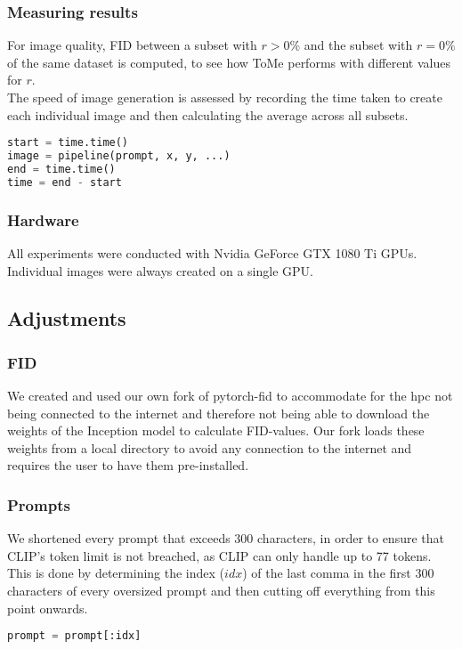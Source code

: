 \subsubsection*{Measuring results}
For image quality, FID between a subset with \(r > 0\%\) and the subset with \(r = 0\%\) of the same dataset is computed, to see how ToMe performs with different values for \(r\).\\
The speed of image generation is assessed by recording the time taken to create each individual image and then calculating the average across all subsets.
\begin{lstlisting}[language=Python]
start = time.time()
image = pipeline(prompt, x, y, ...)
end = time.time()
time = end - start
\end{lstlisting}



\subsubsection*{Hardware}
All experiments were conducted with Nvidia GeForce GTX 1080 Ti GPUs. Individual images were always created on a single GPU.



\subsection{Adjustments}
\subsubsection*{FID}
We created and used our own fork of pytorch-fid \cite{Seitzer2020FID} to accommodate for the hpc not being connected to the internet and therefore not being able to download the weights of the Inception model to calculate FID-values. Our fork loads these weights from a local directory to avoid any connection to the internet and requires the user to have them pre-installed.



\subsubsection*{Prompts}
We shortened every prompt that exceeds 300 characters, in order to ensure that CLIP's token limit is not breached, as CLIP can only handle up to 77 tokens.
This is done by determining the index (\(idx\)) of the last comma in the first 300 characters of every oversized prompt and then cutting off everything from this point onwards.
\begin{lstlisting}[language=Python]
prompt = prompt[:idx]
\end{lstlisting}




